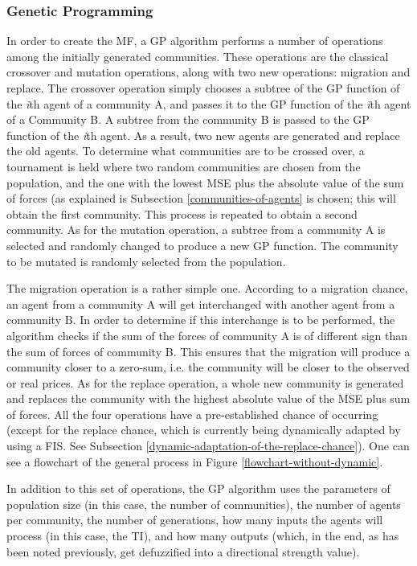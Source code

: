 \documentclass[a4paper,twoside]{article}
\begin{document}
\subsubsection{Genetic Programming}

In order to create the MF, a GP algorithm performs a number of operations among the initially generated communities. These operations are the classical crossover and mutation operations, along with two new operations: migration and replace. The crossover operation simply chooses a subtree of the GP function of the \textit{i}th agent of a community A, and passes it to the GP function of the \textit{i}th agent of a Community B. A subtree from the community B is passed to the GP function of the \textit{i}th agent. As a result, two new agents are generated and replace the old agents. To determine what communities are to be crossed over, a tournament is held where two random communities are chosen from the population, and the one with the lowest MSE plus the absolute value of the sum of forces (as explained is Subsection \ref{communities-of-agents} is chosen; this will obtain the first community. This process is repeated to obtain a second community. As for the mutation operation, a subtree from a community A is selected and randomly changed to produce a new GP function. The community to be mutated is randomly selected from the population.

The migration operation is a rather simple one. According to a migration chance, an agent from a community A will get interchanged with another agent from a community B. In order to determine if this interchange is to be performed, the algorithm checks if the sum of the forces of community A is of different sign than the sum of forces of community B. This ensures that the migration will produce a community closer to a zero-sum, i.e. the community will be closer to the observed or real prices. As for the replace operation, a whole new community is generated and replaces the community with the highest absolute value of the MSE plus sum of forces. All the four operations have a pre-established chance of occurring (except for the replace chance, which is currently being dynamically adapted by using a FIS. See Subsection \ref{dynamic-adaptation-of-the-replace-chance}). One can see a flowchart of the general process in Figure \ref{flowchart-without-dynamic}.

In addition to this set of operations, the GP algorithm uses the parameters of population size (in this case, the number of communities), the number of agents per community, the number of generations, how many inputs the agents will process (in this case, the TI), and how many outputs (which, in the end, as has been noted previously, get defuzzified into a directional strength value).
\end{document}

